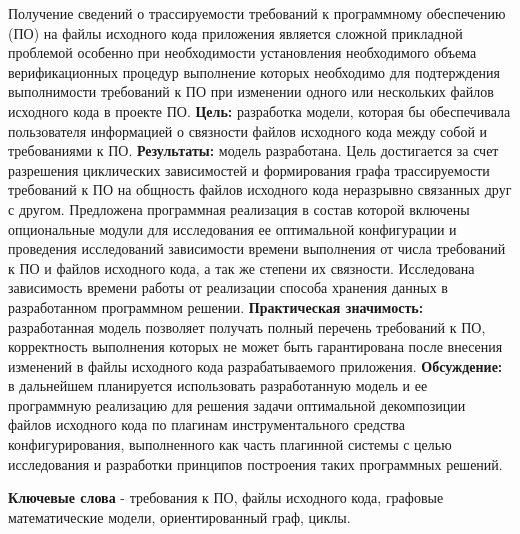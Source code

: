 

Получение сведений о трассируемости требований к программному обеспечению (ПО) на файлы исходного кода приложения является сложной прикладной проблемой особенно при необходимости установления необходимого объема верификационных процедур выполнение которых необходимо для подтерждения выполнимости требований к ПО при изменении одного или нескольких файлов исходного кода в проекте ПО. \textbf{Цель:} разработка модели, которая бы обеспечивала пользователя информацией о связности файлов исходного кода между собой и требованиями к ПО. \textbf{Результаты:} модель разработана. Цель достигается за счет разрешения циклических зависимостей и формирования графа трассируемости требований к ПО на общность файлов исходного кода неразрывно связанных друг с другом. Предложена программная реализация в состав которой включены опциональные модули для исследования ее оптимальной конфигурации и проведения исследований зависимости времени выполнения от числа требований к ПО и файлов исходного кода, а так же степени их связности. Исследована зависимость времени работы от реализации способа хранения данных в разработанном программном решении. \textbf{Практическая значимость:} разработанная модель позволяет получать полный перечень требований к ПО, корректность выполнения которых не может быть гарантирована после внесения изменений в файлы исходного кода разрабатываемого приложения. \textbf{Обсуждение:} в дальнейшем планируется использовать разработанную модель и ее программную реализацию для решения задачи оптимальной декомпозиции файлов исходного кода по плагинам инструментального средства конфигурирования, выполненного как часть плагинной системы с целью исследования и разработки принципов построения таких программных решений.

\textbf{Ключевые слова} - требования к ПО, файлы исходного кода, графовые математические модели, ориентированный граф, циклы.